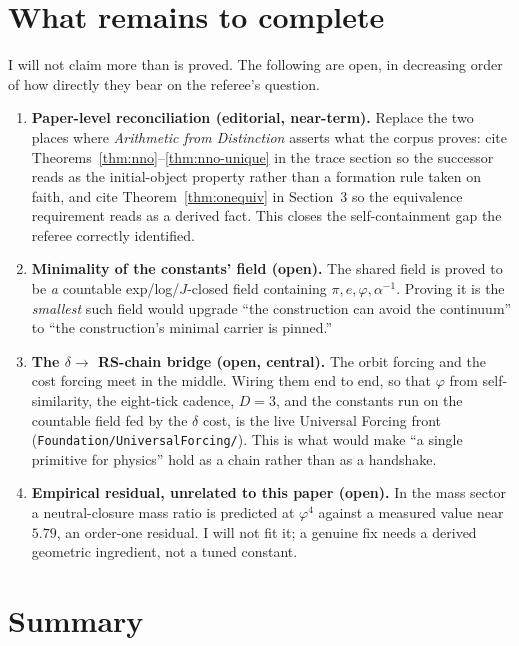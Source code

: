 \documentclass[11pt,a4paper]{article}
\theoremstyle{definition}
\theoremstyle{remark}
\newcommand{\code}[1]{\texttt{\small #1}}
\begin{document}
\section{What remains to complete}\label{sec:remaining}

I will not claim more than is proved. The following are open, in decreasing order
of how directly they bear on the referee's question.

\begin{enumerate}[leftmargin=2em]
  \item \textbf{Paper-level reconciliation (editorial, near-term).} Replace the
    two places where \emph{Arithmetic from Distinction} asserts what the corpus
    proves: cite Theorems~\ref{thm:nno}--\ref{thm:nno-unique} in the trace section
    so the successor reads as the initial-object property rather than a formation
    rule taken on faith, and cite Theorem~\ref{thm:onequiv} in Section~3 so the
    equivalence requirement reads as a derived fact. This closes the
    self-containment gap the referee correctly identified.
  \item \textbf{Minimality of the constants' field (open).} The shared field is
    proved to be \emph{a} countable exp/log/$J$-closed field containing
    $\pi, e, \varphi, \alpha^{-1}$. Proving it is the \emph{smallest} such field
    would upgrade ``the construction can avoid the continuum'' to ``the
    construction's minimal carrier is pinned.''
  \item \textbf{The $\delta \to$ RS-chain bridge (open, central).} The orbit
    forcing and the cost forcing meet in the middle. Wiring them end to end, so
    that $\varphi$ from self-similarity, the eight-tick cadence, $D=3$, and the
    constants run on the countable field fed by the $\delta$ cost, is the live
    Universal Forcing front (\code{Foundation/UniversalForcing/}). This is what
    would make ``a single primitive for physics'' hold as a chain rather than as a
    handshake.
  \item \textbf{Empirical residual, unrelated to this paper (open).} In the mass
    sector a neutral-closure mass ratio is predicted at $\varphi^4$ against a
    measured value near $5.79$, an order-one residual. I will not fit it; a
    genuine fix needs a derived geometric ingredient, not a tuned constant.
\end{enumerate}

\section{Summary}\label{sec:summary}
\end{document}
